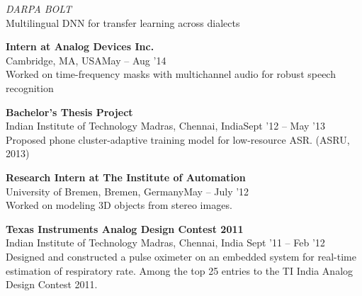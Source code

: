 \documentclass[margin,line,pifont,palatino,courier]{res}
\begin{document}
\begin{resume}
\textit{DARPA BOLT}\\
Multilingual DNN for transfer learning across dialects

\textbf{Intern at Analog Devices Inc.} \\
Cambridge, MA, USA\hfill May -- Aug '14 \vspace{2pt} \\
Worked on time-frequency masks with multichannel audio for robust speech recognition
\vspace{-5pt}

\textbf{Bachelor's Thesis Project} \\
Indian Institute of Technology Madras, Chennai, India\hfill Sept '12 -- May '13 \vspace{2pt}  \\
Proposed phone cluster-adaptive training model for low-resource ASR. (ASRU, 2013)


\textbf{Research Intern at The Institute of Automation}  \\
University of Bremen, Bremen, Germany\hfill May -- July '12 \vspace{2pt}\\
Worked on modeling 3D objects from stereo images. %

\textbf{Texas Instruments Analog Design Contest 2011} \\
Indian Institute of Technology Madras, Chennai, India \hfill Sept '11 -- Feb '12 \vspace{2pt} \\
Designed and constructed a pulse oximeter on an embedded system for real-time estimation of respiratory rate. Among the top 25 entries to the TI India Analog Design Contest 2011.\\
\vspace{-5pt}


\end{resume}
\end{document}
